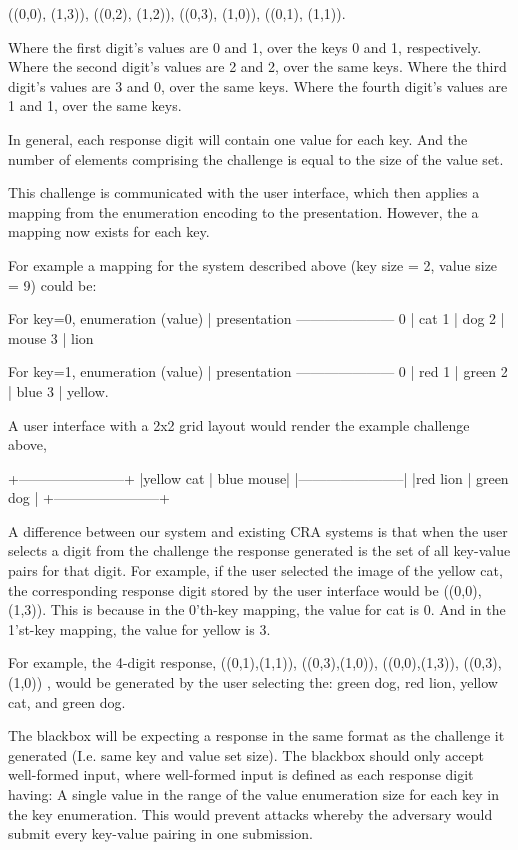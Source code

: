 \documentclass[12pt]{document}
\begin{document}
\begin{Introduction}
  ((0,0), (1,3)), ((0,2), (1,2)),
  ((0,3), (1,0)), ((0,1), (1,1)).

Where the first digit's values are 0 and 1, over the keys 0 and 1, respectively.
Where the second digit's values are 2 and 2, over the same keys.
Where the third digit's values are 3 and 0, over the same keys.
Where the fourth digit's values are 1 and 1, over the same keys.

In general, each response digit will contain one value for each key. And the number of elements comprising the challenge is equal to the size of the value set. 

This challenge is communicated with the user interface, which then applies a mapping from the enumeration encoding to the presentation.
However, the a mapping now exists for each key.

For example a mapping for the system described above (key size = 2, value size = 9) could be:

For key=0,
  enumeration (value) | presentation
  ---------------------
  0 | cat
  1 | dog
  2 | mouse
  3 | lion


For key=1,
  enumeration (value) | presentation
  ---------------------
  0 | red
  1 | green
  2 | blue
  3 | yellow.


A user interface with a 2x2 grid layout would render the example challenge above, 

  +-----------------------+
  |yellow cat | blue mouse|
  |-----------------------|
  |red lion   | green dog |
  +-----------------------+

A difference between our system and existing CRA systems is that when the user selects a digit from the challenge the response generated is the set of all key-value pairs for that digit.
For example, if the user selected the image of the yellow cat, the corresponding response digit stored by the user interface would be ((0,0), (1,3)).
This is because in the 0'th-key mapping, the value for cat is 0. And in the 1'st-key mapping, the value for yellow is 3.

For example, the 4-digit response,
  ((0,1),(1,1)),  ((0,3),(1,0)), ((0,0),(1,3)), ((0,3),(1,0))
, would be generated by the user selecting the:
green dog, red lion, yellow cat, and green dog.

The blackbox will be expecting a response in the same format as the challenge it generated (I.e. same key and value set size).
The blackbox should only accept well-formed input, where well-formed input is defined as each response digit having:
A single value in the range of the value enumeration size for each key in the key enumeration.
This would prevent attacks whereby the adversary would submit every key-value pairing in one submission.


\end{Introduction}
\end{document}
